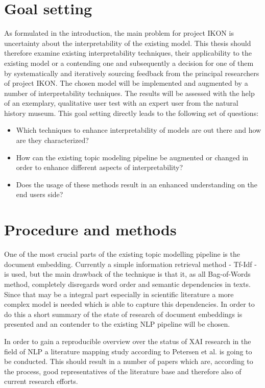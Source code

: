 \documentclass[pdftex,a4paper,12pt]{scrartcl}
\begin{document}
\section{Goal setting} 
As formulated in the introduction, the main problem for project IKON is uncertainty about the interpretability of the existing model. This thesis should therefore examine existing interpretability techniques, their applicability to the existing model or a contending one and subsequently a decision for one of them by systematically and iteratively sourcing feedback from the principal researchers of project IKON. The chosen model will be implemented and augmented by a number of interpretability techniques. The results will be assessed with the help of an exemplary, qualitative user test with an expert user from the natural history museum. This goal setting directly leads to the following set of questions:
\begin{itemize}
	\item Which techniques to enhance interpretability of models are out there and how are they characterized?
	\item How can the existing topic modeling pipeline be augmented or changed in order to enhance different aspects of interpretability?
	\item Does the usage of these methods result in an enhanced understanding on the end users side?
\end{itemize}



\section{Procedure and methods}

One of the most crucial parts of the existing topic modelling pipeline is the document embedding. Currently a simple information retrieval method - Tf-Idf - is used, but the main drawback of the technique is that it, as all Bag-of-Words method, completely disregards word order and semantic dependencies in texts. Since that may be a integral part especially in scientific literature a more complex model is needed which is able to capture this dependencies. In order to do this a short summary of the state of research of document embeddings is presented and an contender to the existing NLP pipeline will be chosen. 

In order to gain a reproducible overview over the status of XAI research in the field of NLP a literature mapping study according to Petersen et al. \cite{petersenSystematicMappingStudies2008} is going to be conducted. This should result in a number of papers which are, according to the process, good representatives of the literature base and therefore also of current research efforts. 
\end{document}

